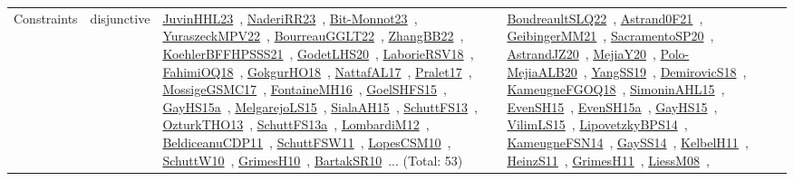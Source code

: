 {\begin{longtable}{lp{3cm}>{\raggedright\arraybackslash}p{6cm}>{\raggedright\arraybackslash}p{6cm}>{\raggedright\arraybackslash}p{8cm}}
Constraints & disjunctive & \href{works/JuvinHHL23.pdf}{JuvinHHL23}~\cite{JuvinHHL23}, \href{works/NaderiRR23.pdf}{NaderiRR23}~\cite{NaderiRR23}, \href{works/Bit-Monnot23.pdf}{Bit-Monnot23}~\cite{Bit-Monnot23}, \href{works/YuraszeckMPV22.pdf}{YuraszeckMPV22}~\cite{YuraszeckMPV22}, \href{works/BourreauGGLT22.pdf}{BourreauGGLT22}~\cite{BourreauGGLT22}, \href{works/ZhangBB22.pdf}{ZhangBB22}~\cite{ZhangBB22}, \href{works/KoehlerBFFHPSSS21.pdf}{KoehlerBFFHPSSS21}~\cite{KoehlerBFFHPSSS21}, \href{works/GodetLHS20.pdf}{GodetLHS20}~\cite{GodetLHS20}, \href{works/LaborieRSV18.pdf}{LaborieRSV18}~\cite{LaborieRSV18}, \href{works/FahimiOQ18.pdf}{FahimiOQ18}~\cite{FahimiOQ18}, \href{works/GokgurHO18.pdf}{GokgurHO18}~\cite{GokgurHO18}, \href{works/NattafAL17.pdf}{NattafAL17}~\cite{NattafAL17}, \href{works/Pralet17.pdf}{Pralet17}~\cite{Pralet17}, \href{works/MossigeGSMC17.pdf}{MossigeGSMC17}~\cite{MossigeGSMC17}, \href{works/FontaineMH16.pdf}{FontaineMH16}~\cite{FontaineMH16}, \href{works/GoelSHFS15.pdf}{GoelSHFS15}~\cite{GoelSHFS15}, \href{works/GayHS15a.pdf}{GayHS15a}~\cite{GayHS15a}, \href{works/MelgarejoLS15.pdf}{MelgarejoLS15}~\cite{MelgarejoLS15}, \href{works/SialaAH15.pdf}{SialaAH15}~\cite{SialaAH15}, \href{works/SchuttFS13.pdf}{SchuttFS13}~\cite{SchuttFS13}, \href{works/OzturkTHO13.pdf}{OzturkTHO13}~\cite{OzturkTHO13}, \href{works/SchuttFS13a.pdf}{SchuttFS13a}~\cite{SchuttFS13a}, \href{works/LombardiM12.pdf}{LombardiM12}~\cite{LombardiM12}, \href{works/BeldiceanuCDP11.pdf}{BeldiceanuCDP11}~\cite{BeldiceanuCDP11}, \href{works/SchuttFSW11.pdf}{SchuttFSW11}~\cite{SchuttFSW11}, \href{works/LopesCSM10.pdf}{LopesCSM10}~\cite{LopesCSM10}, \href{works/SchuttW10.pdf}{SchuttW10}~\cite{SchuttW10}, \href{works/GrimesH10.pdf}{GrimesH10}~\cite{GrimesH10}, \href{works/BartakSR10.pdf}{BartakSR10}~\cite{BartakSR10}... (Total: 53) & \href{works/BoudreaultSLQ22.pdf}{BoudreaultSLQ22}~\cite{BoudreaultSLQ22}, \href{works/Astrand0F21.pdf}{Astrand0F21}~\cite{Astrand0F21}, \href{works/GeibingerMM21.pdf}{GeibingerMM21}~\cite{GeibingerMM21}, \href{works/SacramentoSP20.pdf}{SacramentoSP20}~\cite{SacramentoSP20}, \href{works/AstrandJZ20.pdf}{AstrandJZ20}~\cite{AstrandJZ20}, \href{works/MejiaY20.pdf}{MejiaY20}~\cite{MejiaY20}, \href{works/Polo-MejiaALB20.pdf}{Polo-MejiaALB20}~\cite{Polo-MejiaALB20}, \href{works/YangSS19.pdf}{YangSS19}~\cite{YangSS19}, \href{works/DemirovicS18.pdf}{DemirovicS18}~\cite{DemirovicS18}, \href{works/KameugneFGOQ18.pdf}{KameugneFGOQ18}~\cite{KameugneFGOQ18}, \href{works/SimoninAHL15.pdf}{SimoninAHL15}~\cite{SimoninAHL15}, \href{works/EvenSH15.pdf}{EvenSH15}~\cite{EvenSH15}, \href{works/EvenSH15a.pdf}{EvenSH15a}~\cite{EvenSH15a}, \href{works/GayHS15.pdf}{GayHS15}~\cite{GayHS15}, \href{works/VilimLS15.pdf}{VilimLS15}~\cite{VilimLS15}, \href{works/LipovetzkyBPS14.pdf}{LipovetzkyBPS14}~\cite{LipovetzkyBPS14}, \href{works/KameugneFSN14.pdf}{KameugneFSN14}~\cite{KameugneFSN14}, \href{works/GaySS14.pdf}{GaySS14}~\cite{GaySS14}, \href{works/KelbelH11.pdf}{KelbelH11}~\cite{KelbelH11}, \href{works/HeinzS11.pdf}{HeinzS11}~\cite{HeinzS11}, \href{works/GrimesH11.pdf}{GrimesH11}~\cite{GrimesH11}, \href{works/LiessM08.pdf}{LiessM08}~\cite{LiessM08}, 
\end{longtable}}
